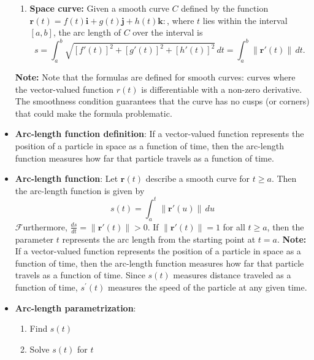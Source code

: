 \documentclass{report}
\begin{document}
\begin{itemize}
\begin{enumerate}
                \item \textbf{Space curve:} Given a smooth curve $C$ defined by the function $\mathbf{r}(t) = f(t)\mathbf{i} + g(t)\mathbf{j} + h(t)\mathbf{k}:$, where $t$ lies within the interval $[a,b]$, the arc length of $C$ over the interval is
                    \begin{equation}
                        s = \int_{a}^{b} \sqrt{[f'(t)]^2 + [g'(t)]^2 + [h'(t)]^2} \, dt = \int_{a}^{b} \|\mathbf{r}'(t)\| \, dt.
                    \end{equation}
            \end{enumerate}
            \bigbreak \noindent 
            \textbf{Note:} Note that the formulas are defined for smooth curves: curves where the vector-valued function $r(t)$ is differentiable with a non-zero derivative. The smoothness condition guarantees that the curve has no cusps (or corners) that could make the formula problematic.
        \item \textbf{Arc-length function definition}: If a vector-valued function represents the position of a particle in space as a function of time, then the arc-length function measures how far that particle travels as a function of time.
        \item \textbf{Arc-length function}:
            Let $\mathbf{r}(t)$ describe a smooth curve for $t \geq a$. Then the arc-length function is given by
            \begin{equation}
                s(t) = \int_{a}^{t} \|\mathbf{r}'(u)\| \, du
            \end{equation}
            $\mathscr{F}$urthermore, $\frac{ds}{dt} = \|\mathbf{r}'(t)\| > 0$. If $\|\mathbf{r}'(t)\| = 1$ for all $t \geq a$, then the parameter $t$ represents the arc length from the starting point at $t = a$.
            \bigbreak \noindent 
            \textbf{Note:} If a vector-valued function represents the position of a particle in space as a function of time, then the arc-length function measures how far that particle travels as a function of time.
            \bigbreak \noindent 
            Since  $s(t)$ measures distance traveled as a function of time,  $s^{\prime}(t)$ measures the speed of the particle at any given time.
            \bigbreak \noindent 
        \item \textbf{Arc-length parametrization}:
            \begin{enumerate}
                \item Find $s(t)$
                \item Solve $s(t)$ for $t$

\end{enumerate}
\end{itemize}
\end{document}
